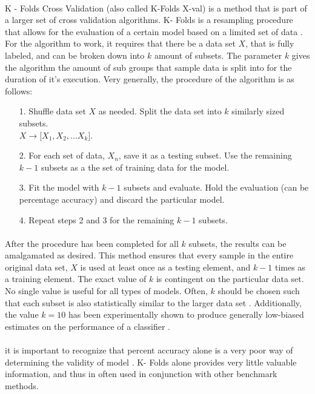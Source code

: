 \documentclass[12pt,letterpaper]{article}
\begin{document}
\paragraph*{} K - Folds Cross Validation (also called K-Folds X-val) is a method that is part of a larger set of cross validation algorithms. K- Folds is a resampling procedure that allows for the evaluation of a certain model based on a limited set of data \cite{Brownlee}. For the algorithm to work, it requires that there be a data set $X$, that is fully labeled, and can be broken down into $k$ amount of subsets. The parameter $k$ gives the algorithm the amount of sub groups that sample data is split into for the duration of it's execution. Very generally, the procedure of the algorithm is as follows:
\begin{enumerate}
\item[1.]Shuffle data set $X$ as needed. Split the data set into $k$ similarly sized subsets. \\$X \rightarrow \big[ X_1 , X_2 , ... X_k \big]$.
\item[2.]For each set of data, $X_n$, save it as a testing subset. Use the remaining $k-1$ subsets as a the set of training data for the model.
\item[3.]Fit the model with $k-1$ subsets and evaluate. Hold the evaluation (can be percentage accuracy) and discard the particular model.
\item[4.]Repeat steps 2 and 3 for the remaining $k-1$ subsets.
\end{enumerate}
\paragraph*{}After the procedure has been completed for all $k$ subsets, the results can be amalgamated as desired. This method ensures that every sample in the entire original data set, $X$ is used at least once as a testing element, and $k-1$ times as a training element. The exact value of $k$ is contingent on the particular data set. No single value is useful for all types of models. Often, $k$ should be chosen such that each subset is also statistically similar to the larger data set \cite{Geron}. Additionally, the value $k = 10$ has been experimentally shown to produce generally low-biased estimates on the performance of a classifier \cite{Brownlee}.
\paragraph*{}it is important to recognize that percent accuracy alone is a very poor way of determining the validity of model \cite{Geron}. K- Folds alone provides very little valuable information, and thus in often used in conjunction with other benchmark methods.
\end{document}
